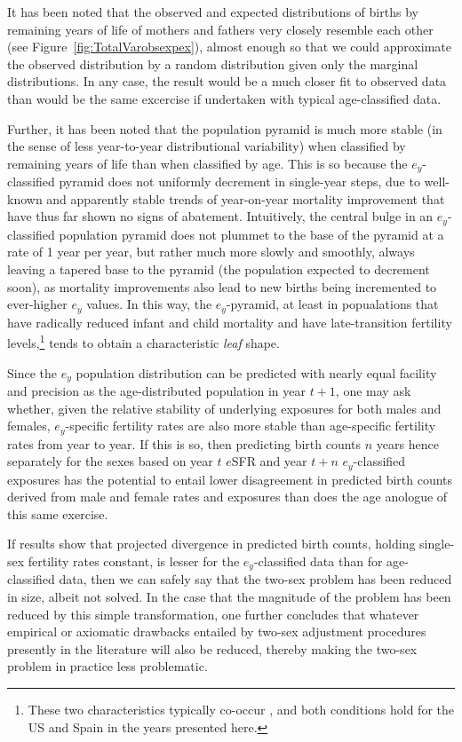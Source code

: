  \FloatBarrier
\label{sec:exdivergence}
It has been noted that the observed and expected distributions of births by
remaining years of life of mothers and fathers very closely resemble each other
(see Figure~\ref{fig:TotalVarobsexpex}), almost enough so that we could
approximate the observed distribution by a random distribution given only the
marginal distributions. In any case, the result would be a much closer fit to
observed data than would be the same excercise if undertaken with typical
age-classified data. 

Further, it has been noted that the population pyramid is
much more stable (in the sense of less year-to-year
distributional variability) when classified by remaining years
of life than when classified by age. This is so because the $e_y$-classified 
pyramid does not uniformly decrement in single-year steps, due
to well-known and apparently stable trends of year-on-year mortality improvement
that have thus far shown no signs of abatement. Intuitively, the central bulge
in an $e_y$-classified population pyramid does not plummet to the base of the 
pyramid at a rate of 1
year per year, but rather much more slowly and smoothly, always leaving a
tapered base to the pyramid (the population expected to decrement soon), as
mortality improvements also lead to new births being incremented to ever-higher
$e_y$ values. In this way, the $e_y$-pyramid, at least in popualations that have
radically reduced infant and child mortality and have late-transition fertility 
levels,\footnote{These two characteristics typically co-occur
\citep{macinnes2009reproductive}, and both conditions hold for the US and Spain
in the years presented here.} tends to obtain a characteristic \textit{leaf}
shape.

Since the $e_y$ population distribution can be predicted
with nearly equal facility and precision as the age-distributed population in
year $t+1$, one may ask whether, given the relative stability of underlying
exposures for both males and females, $e_y$-specific fertility rates are 
also more stable than
age-specific fertility rates from year to year. If this is so, then predicting 
birth counts $n$ years hence separately for the sexes based
on year $t$ $e$SFR and year $t + n$ $e_y$-classified exposures has the
potential to entail lower disagreement in predicted birth counts derived
from male and female rates and exposures than does the age
anologue of this same exercise.

If results show that projected divergence in predicted birth counts, holding
single-sex fertility rates constant, is lesser for the $e_y$-classified data
than for age-classified data, then we can safely say that the two-sex problem
has been reduced in size, albeit not solved. In the case that the magnitude of
the problem has been reduced by this simple transformation, one further
concludes that whatever empirical or axiomatic drawbacks entailed by 
two-sex adjustment procedures presently in the literature will also be reduced,
thereby making the two-sex problem in practice less problematic. 

